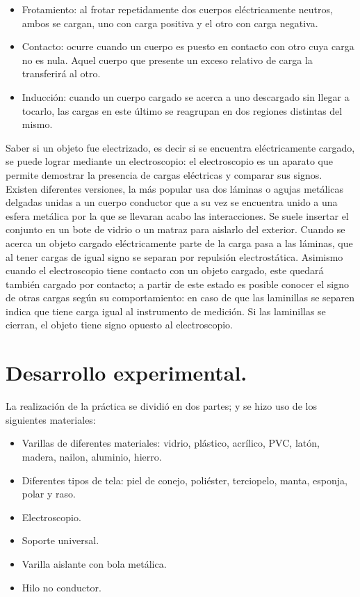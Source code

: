 \documentclass[letterpaper, 11 pt]{article}
\begin{document}
\begin{multicols*}{2}
\begin{itemize}
    \item Frotamiento: al frotar repetidamente dos cuerpos eléctricamente neutros, ambos se cargan, uno con carga positiva y el otro con carga negativa.
    \item Contacto: ocurre cuando un cuerpo es puesto en contacto con otro cuya carga no es nula. Aquel cuerpo que presente un exceso relativo de carga la transferirá al otro.
    \item Inducción: cuando un cuerpo cargado se acerca a uno descargado sin llegar a tocarlo, las cargas en este último se reagrupan en dos regiones distintas del mismo.
\end{itemize}

Saber si un objeto fue electrizado, es decir si se encuentra eléctricamente cargado, se puede lograr mediante un electroscopio: el electroscopio es un aparato que permite demostrar la presencia de cargas eléctricas y comparar sus signos. Existen diferentes versiones, la más popular usa dos láminas o agujas metálicas delgadas unidas a un cuerpo conductor que a su vez se encuentra unido a una esfera metálica por la que se llevaran acabo las interacciones. Se suele insertar el conjunto en un bote de vidrio o un matraz para aislarlo del exterior. Cuando se acerca un objeto cargado eléctricamente parte de la carga pasa a las láminas,  que  al  tener  cargas  de  igual  signo  se  separan  por  repulsión  electrostática. Asimismo cuando el electroscopio tiene contacto con un objeto cargado, este quedará también cargado por contacto; a partir de este estado es posible conocer el signo de otras cargas según su comportamiento: en caso de que las laminillas se separen indica que tiene carga igual al instrumento de medición. Si las laminillas se cierran, el objeto tiene signo opuesto al electroscopio. \cite{electro}

\section{Desarrollo experimental.}
La realización de la práctica se dividió en dos partes; y se hizo uso de los siguientes materiales:

\begin{itemize}
    \item Varillas de diferentes materiales: vidrio, plástico, acrílico, PVC, latón, madera, nailon, aluminio, hierro.
    \item Diferentes tipos de tela: piel de conejo, poliéster, terciopelo,  manta, esponja, polar y raso.
    \item Electroscopio.
    \item Soporte universal.
    \item Varilla aislante con bola metálica.
    \item Hilo no conductor.
\end{itemize}


\end{multicols*}
\end{document}
